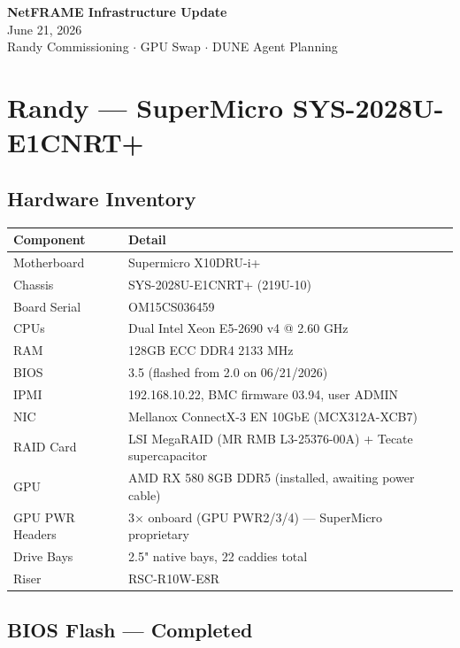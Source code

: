 \documentclass[11pt, letterpaper]{article}
\begin{document}
\begin{center}
    {\LARGE \textbf{NetFRAME Infrastructure Update}}\\[0.5em]
    {\large June 21, 2026}\\[0.3em]
    {\normalsize Randy Commissioning $\cdot$ GPU Swap $\cdot$ DUNE Agent Planning}
\end{center}

\vspace{1em}

\section{Randy — SuperMicro SYS-2028U-E1CNRT+}

\subsection{Hardware Inventory}

\begin{tabularx}{\textwidth}{lX}
\toprule
\textbf{Component} & \textbf{Detail} \\
\midrule
Motherboard     & Supermicro X10DRU-i+ \\
Chassis         & SYS-2028U-E1CNRT+ (219U-10) \\
Board Serial    & OM15CS036459 \\
CPUs            & Dual Intel Xeon E5-2690 v4 @ 2.60 GHz \\
RAM             & 128GB ECC DDR4 2133 MHz \\
BIOS            & 3.5 (flashed from 2.0 on 06/21/2026) \\
IPMI            & 192.168.10.22, BMC firmware 03.94, user ADMIN \\
NIC             & Mellanox ConnectX-3 EN 10GbE (MCX312A-XCB7) \\
RAID Card       & LSI MegaRAID (MR RMB L3-25376-00A) + Tecate supercapacitor \\
GPU             & AMD RX 580 8GB DDR5 (installed, awaiting power cable) \\
GPU PWR Headers & 3$\times$ onboard (GPU PWR2/3/4) — SuperMicro proprietary \\
Drive Bays      & 2.5" native bays, 22 caddies total \\
Riser           & RSC-R10W-E8R \\
\bottomrule
\end{tabularx}

\subsection{BIOS Flash — Completed \checkmark}
\end{document}
